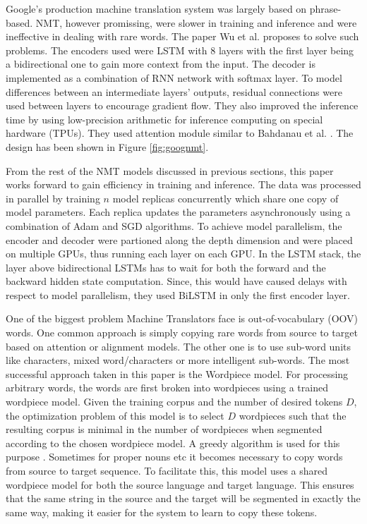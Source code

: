 \documentclass{article}
\begin{document}
	Google's production machine translation system was largely based on phrase-based. NMT, however promissing, were slower in training and inference and were ineffective in dealing with rare words. The paper Wu et al. \cite{goognmt} proposes to solve such problems. The encoders used were LSTM with 8 layers with the first layer being a bidirectional one to gain more context from the input. The decoder is implemented as a combination of RNN network with softmax layer. To model differences between an intermediate layers' outputs, residual connections were used between layers to encourage gradient flow. They also improved the inference time by using low-precision arithmetic for inference computing on special hardware (TPUs). They used attention module similar to Bahdanau et al. \cite{bahattn}. The design has been shown in Figure \ref{fig:goognmt}.
	
	From the rest of the NMT models discussed in previous sections, this paper works forward to gain efficiency in training and inference. The data was processed in parallel by training \(n\) model replicas concurrently which share one copy of model parameters. Each replica updates the parameters asynchronously using a combination of Adam \cite{adam} and SGD algorithms. To achieve model parallelism, the encoder and decoder were partioned along the depth dimension and were placed on multiple GPUs, thus running each layer on each GPU. In the LSTM stack, the layer above bidirectional LSTMs has to wait for both the forward and the backward hidden state computation. Since, this would have caused delays with respect to model parallelism, they used BiLSTM in only the first encoder layer.
	
	One of the biggest problem Machine Translators face is out-of-vocabulary (OOV) words. One common approach is simply copying rare words from source to target based on attention or alignment models. The other one is to use sub-word units like characters, mixed word/characters or more intelligent sub-words. The most successful approach taken in this paper is the Wordpiece model. For processing arbitrary words, the words are first broken into wordpieces using a trained wordpiece model. Given the training corpus and the number of desired tokens \(D\), the optimization problem of this model is to select \(D\) wordpieces such that the resulting corpus is minimal in the number of wordpieces when segmented according to the chosen wordpiece model. A greedy algorithm is used for this purpose \cite{subword}. Sometimes for proper nouns etc it becomes necessary to copy words from source to target sequence. To facilitate this, this model uses a shared wordpiece model for both the source language and target language. This ensures that the same string in the source and the target will be segmented in exactly the same way, making it easier for the system to learn to copy these tokens.
	
\end{document}
